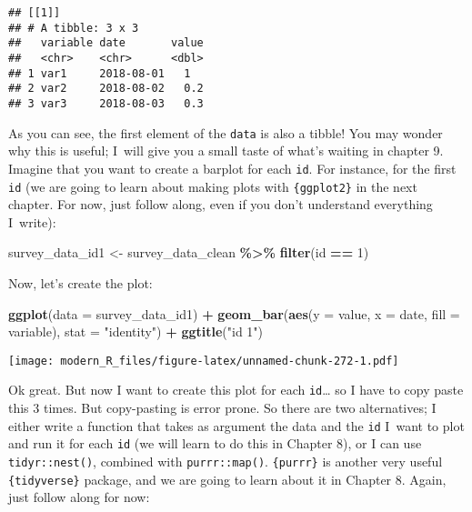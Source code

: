 \documentclass[
]{article}
\newenvironment{Shaded}{\begin{snugshade}}{\end{snugshade}}
\newcommand{\DataTypeTok}[1]{\textcolor[rgb]{0.13,0.29,0.53}{#1}}
\newcommand{\DecValTok}[1]{\textcolor[rgb]{0.00,0.00,0.81}{#1}}
\newcommand{\KeywordTok}[1]{\textcolor[rgb]{0.13,0.29,0.53}{\textbf{#1}}}
\newcommand{\NormalTok}[1]{#1}
\newcommand{\OperatorTok}[1]{\textcolor[rgb]{0.81,0.36,0.00}{\textbf{#1}}}
\newcommand{\StringTok}[1]{\textcolor[rgb]{0.31,0.60,0.02}{#1}}
\begin{document}
\begin{verbatim}
## [[1]]
## # A tibble: 3 x 3
##   variable date       value
##   <chr>    <chr>      <dbl>
## 1 var1     2018-08-01   1  
## 2 var2     2018-08-02   0.2
## 3 var3     2018-08-03   0.3
\end{verbatim}

As you can see, the first element of the \texttt{data} is also a tibble! You may wonder why this is useful;
I~will give you a small taste of what's waiting in chapter 9. Imagine that you want to create a
barplot for each \texttt{id}. For instance, for the first \texttt{id} (we are going to learn about making plots
with \texttt{\{ggplot2\}} in the next chapter. For now, just follow along, even if you don't understand
everything I~write):

\begin{Shaded}
\begin{Highlighting}[]
\NormalTok{survey\_data\_id1 \textless{}{-}}\StringTok{ }\NormalTok{survey\_data\_clean }\OperatorTok{\%\textgreater{}\%}
\StringTok{    }\KeywordTok{filter}\NormalTok{(id }\OperatorTok{==}\StringTok{ }\DecValTok{1}\NormalTok{)}
\end{Highlighting}
\end{Shaded}

Now, let's create the plot:

\begin{Shaded}
\begin{Highlighting}[]
\KeywordTok{ggplot}\NormalTok{(}\DataTypeTok{data =}\NormalTok{ survey\_data\_id1) }\OperatorTok{+}
\StringTok{    }\KeywordTok{geom\_bar}\NormalTok{(}\KeywordTok{aes}\NormalTok{(}\DataTypeTok{y =}\NormalTok{ value, }\DataTypeTok{x =}\NormalTok{ date, }\DataTypeTok{fill =}\NormalTok{ variable), }\DataTypeTok{stat =} \StringTok{"identity"}\NormalTok{) }\OperatorTok{+}
\StringTok{    }\KeywordTok{ggtitle}\NormalTok{(}\StringTok{"id 1"}\NormalTok{)}
\end{Highlighting}
\end{Shaded}

\texttt{[image: modern\_R\_files/figure-latex/unnamed-chunk-272-1.pdf]}

Ok great. But now I want to create this plot for each \texttt{id}\ldots{} so I have to copy paste this 3 times.
But copy-pasting is error prone. So there are two alternatives; I either write a function that
takes as argument the data and the \texttt{id} I~want to plot and run it for each \texttt{id} (we will learn to
do this in Chapter 8), or I can use \texttt{tidyr::nest()}, combined with \texttt{purrr::map()}. \texttt{\{purrr\}} is
another very useful \texttt{\{tidyverse\}} package, and we are going to learn about it in Chapter 8. Again,
just follow along for now:
\end{document}
